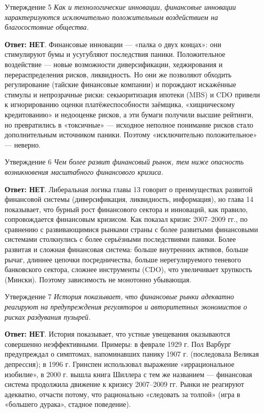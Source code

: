 \documentclass[10pt,a4paper]{article}
\newcommand{\qnet}{\textbf{\color{nored}Ответ: НЕТ}}
\newenvironment{answer}[2]{%
  \begin{qbox}{Утверждение #1}
  \textit{#2}\par\smallskip
}{%
  \end{qbox}\vspace{2pt}
}
\begin{document}
\begin{answer}{5}{Как и технологические инновации, финансовые инновации характеризуются исключительно положительным воздействием на благосостояние общества.}
\qnet. Финансовые инновации --- «палка о двух концах»: они стимулируют бумы и усугубляют последствия паники. Положительное воздействие --- новые возможности диверсификации, хеджирования и перераспределения рисков, ликвидность. Но они же позволяют обходить регулирование (тайские финансовые компании) и порождают искажённые стимулы и непрозрачные риски: секьюритизация ипотеки (MBS) и CDO привели к игнорированию оценки платёжеспособности заёмщика, «хищническому кредитованию» и недооценке рисков, а эти бумаги получили высшие рейтинги, но превратились в «токсичные» --- исходное неполное понимание рисков стало дополнительным источником паники. Поэтому «исключительно положительное» --- неверно.
\end{answer}

\begin{answer}{6}{Чем более развит финансовый рынок, тем ниже опасность возникновения масштабного финансового кризиса.}
\qnet. Либеральная логика главы 13 говорит о преимуществах развитой финансовой системы (диверсификация, ликвидность, информация), но глава 14 показывает, что бурный рост финансового сектора и инноваций, как правило, сопровождается финансовым кризисом. Как показал кризис 2007--2009 гг., по сравнению с развивающимися рынками страны с более развитыми финансовыми системами столкнулись с более серьёзными последствиями паники. Более развитая и сложная финансовая система: больше внутренних активов, больше рычаг, длиннее цепочки посредничества, больше нерегулируемого теневого банковского сектора, сложнее инструменты (CDO), что увеличивает хрупкость (Мински). Поэтому зависимость не монотонно убывающая.
\end{answer}

\begin{answer}{7}{История показывает, что финансовые рынки адекватно реагируют на предупреждения регуляторов и авторитетных экономистов о рисках раздувания пузырей.}
\qnet. История показывает, что устные увещевания оказываются совершенно неэффективными. Примеры: в феврале 1929 г. Пол Варбург предупреждал о симптомах, напоминавших панику 1907 г. (последовала Великая депрессия); в 1996 г. Гринспен использовал выражение «иррациональное изобилие», в 2000 г. вышла книга Шиллера с тем же названием --- финансовая система продолжила движение к кризису 2007--2009 гг. Рынки не реагируют адекватно, отчасти потому, что рационально «следовать за толпой» (игра в «большего дурака», стадное поведение).
\end{answer}
\end{document}
